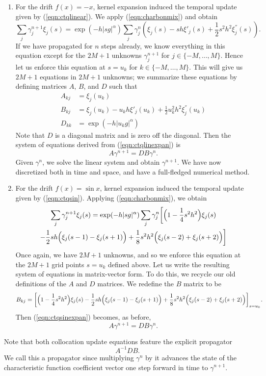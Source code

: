 \documentclass[11pt,letterpaper]{article}
\begin{document}
\begin{enumerate}
\item For the drift $f(x) = -x$, kernel expansion induced the temporal update given by (\ref{eqn:ctqlinear}).  We apply (\ref{eqn:charbonmix}) and obtain
\begin{equation}
\label{eqn:ctqlinexpan}
\sum_j \gamma^{n+1}_j \xi_j(s) = \exp(-h |sg|^{\alpha})  \sum_j \gamma^n_j \left( \xi_j(s) - s h \xi'_j(s) + \frac{1}{2} s^2 h^2 \xi^{''}_j(s) \right).
\end{equation}
If we have propagated for $n$ steps already, we know everything in this equation except for the $2M+1$ unknowns $\gamma_{j}^{n+1}$ for $j \in \{-M, \ldots, M\}$.  Hence let us enforce this equation at $s = u_k$ for $k \in \{-M, \ldots, M\}$.  This will give us $2M+1$ equations in $2M+1$ unknowns; we summarize these equations by defining matrices $A$, $B$, and $D$ such that
\begin{align*}
A_{kj} &= \xi_j(u_k) \\
B_{kj} &= \xi_j(u_k) - u_k h \xi'_j(u_k) + \frac{1}{2} u_k^2 h^2 \xi^{''}_j(u_k) \\
D_{kk} &= \exp(-h|u_k g|^{\alpha})
\end{align*}
Note that $D$ is a diagonal matrix and is zero off the diagonal.
Then the system of equations derived from (\ref{eqn:ctqlinexpan}) is
\[
A \gamma^{n+1} = D B \gamma^n.
\]
Given $\gamma^n$, we solve the linear system and obtain $\gamma^{n+1}$.  We have now discretized both in time and space, and have a full-fledged numerical method.
\item For the drift $f(x) = \sin x$, kernel expansion induced the temporal update given by (\ref{eqn:ctqsin}).  Applying (\ref{eqn:charbonmix}), we obtain
\begin{multline}
\label{eqn:ctqsinexpan}
\sum_j \gamma^{n+1}_j \xi_j(s) = \exp(-h |s g|^{\alpha}) \sum_j \gamma^n_j \biggl[
\Bigl( 1 - \frac{1}{4} s^2 h^2 \Bigr) \xi_j(s) \\
- \frac{1}{2} s h \Bigl( \xi_j(s-1) - \xi_j(s + 1) \Bigr)
+ \frac{1}{8} s^2 h^2 \Bigl( \xi_j(s-2) + \xi_j(s + 2) \Bigr) \biggr]
\end{multline}
Once again, we have $2M+1$ unknowns, and so we enforce this equation at the $2M+1$ grid points $s = u_k$ defined above.  Let us write the resulting system of equations in matrix-vector form.  To do this, we recycle our old definitions of the $A$ and $D$ matrices.  We redefine the $B$ matrix to be
\[
B_{kj} = \biggl[
\Bigl( 1 - \frac{1}{4} s^2 h^2 \Bigr) \xi_j(s)
- \frac{1}{2} s h \Bigl( \xi_j(s-1) - \xi_j(s + 1) \Bigr)
+ \frac{1}{8} s^2 h^2 \Bigl( \xi_j(s-2) + \xi_j(s + 2) \Bigr) \biggr]_{s = u_k}.
\]
Then (\ref{eqn:ctqsinexpan}) becomes, as before,
\[
A \gamma^{n+1} = D B \gamma^n.
\]
\end{enumerate}
Note that both collocation update equations feature the explicit propagator
\[
A^{-1} D B.
\]
We call this a propagator since multiplying $\gamma^n$ by it advances the state of the characteristic function coefficient vector one step forward in time to $\gamma^{n+1}$.
\end{document}
